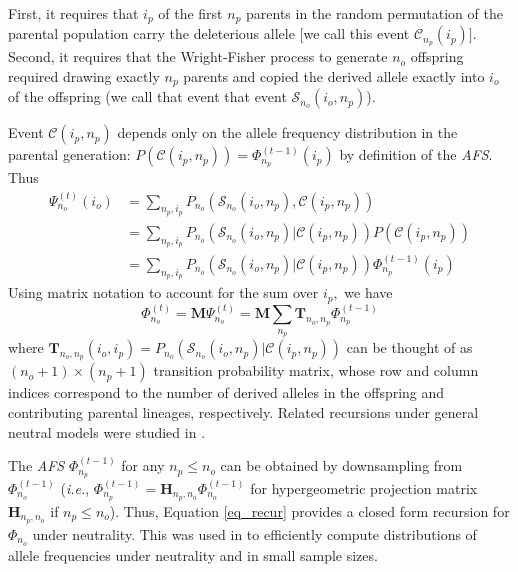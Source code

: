 \documentclass[9pt,twocolumn,twoside,lineno]{gsajnl}
\newcommand{\afs}[2]{\Phi_{#1}^{(#2)}}
\newcommand{\afsPsi}[2]{\Psi_{#1}^{(#2)}}
\begin{document}
First, it requires that $i_p$ of the first $n_p$ parents in the random permutation of the parental population carry the deleterious allele [we call this event $\mathcal{C}_{n_p}(i_p)]$. Second, 
 it requires that the
Wright-Fisher process to generate $n_o$ offspring required drawing exactly $n_p$ parents and copied the derived allele exactly into $i_o$ of the offspring (we call that event that event $\mathcal{S}_{n_o}(i_o, n_p)$).


Event $\mathcal{C}(i_p, n_p)$ depends only on the allele frequency distribution in the parental generation: $P(\mathcal{C}(i_p,n_p)) =\afs{n_p}{t-1} (i_p)$ by definition of the \textit{AFS}. Thus
\begin{equation}
  \begin{split}
    \afsPsi{n_o}{t}(i_o)&= \sum_{n_p,i_p} P_{n_o}(\mathcal{S}_{n_o}(i_o, n_p), \mathcal{C}(i_p,n_p) )\\
    &=   \sum_{n_p,i_p} P_{n_o}(\mathcal{S}_{n_o}(i_o, n_p)| \mathcal{C}(i_p,n_p) ) P(\mathcal{C}(i_p,n_p))\\
    &=   \sum_{n_p,i_p} P_{n_o}(\mathcal{S}_{n_o}(i_o, n_p)| \mathcal{C}(i_p,n_p) )  \afs{n_p}{t-1}(i_p)%
  \end{split}
\end{equation}
Using matrix notation to account for the sum over $i_p,$ we have
\begin{equation}
  \afs{n_o}{t} = \mathbf{M}  \afsPsi{n_o}{t} =  \mathbf{M}  \sum_{n_p}  \mathbf{T}_{n_o,n_p}     \afs{n_p}{t-1}
    \label{eq_recur}
  \end{equation}
where $\mathbf{T}_{n_o,n_p}(i_o,i_p) = P_{n_o}(\mathcal{S}_{n_o}(i_o, n_p)| \mathcal{C}(i_p,n_p) ) $ 
can be thought of as $(n_o+1) \times (n_p+1)$ transition
probability matrix, whose row and column indices correspond to the number of derived alleles in the
offspring and contributing parental lineages, respectively. Related recursions under general neutral 
models were studied in \cite{Lessard2010}.

The \textit{AFS}  $\afs{n_p}{t-1}$ for any  $n_p\leq n_o$ can be obtained by downsampling from $\afs{n_o}{t-1}$ (\textit{i.e.}, $\afs{n_p}{t-1} =
\mathbf{H}_{n_p,n_o} \afs{n_o}{t-1}$ for hypergeometric projection matrix $\mathbf{H}_{n_p,n_o}$ if
$n_p\leq n_o$). Thus, Equation \eqref{eq_recur} provides a closed form recursion for $\Phi_{n_o}$ under neutrality. 
This was used in \cite{JouganousEtAl2017} to efficiently 
compute distributions of allele frequencies under neutrality and in small sample sizes.
\end{document}
